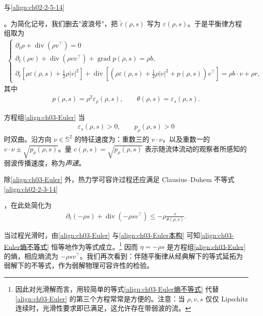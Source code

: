 ﻿\documentclass[../../main.tex]{subfiles}
\begin{document}
与\eqref{align:ch02-2-5-14}%

。为简化记号，我们删去"波浪号"，把 $\tilde{\varepsilon}(\rho,s)$ 写为 $\varepsilon(\rho,s)$。于是平衡律方程组取为
\begin{align}
\begin{cases}
\partial_{t}\rho+\operatorname{div}(\rho v^{\top})=0\\
\partial_{t}(\rho v)+\operatorname{div}(\rho vv^{\top})+\operatorname{grad}p(\rho,s)=\rho b,\\
\partial_{t}\left[\rho\varepsilon(\rho,s)+\frac{1}{2}\rho|v|^{2}\right]+\operatorname{div}\left[\left(\rho\varepsilon(\rho,s)+\frac{1}{2}\rho|v|^{2}+p(\rho,s)\right)v^{\top}\right]=\rho b\cdot v+\rho r,
\end{cases}
\label{align:ch03-Euler}
\end{align}
其中
\begin{align}
p(\rho,s)=\rho^{2}\varepsilon_{\rho}(\rho,s),\qquad \theta(\rho,s)=\varepsilon_{s}(\rho,s).
\label{align:ch03-Euler本构}
\end{align}

方程组\eqref{align:ch03-Euler} 当
\begin{align}
\varepsilon_{s}(\rho,s)>0,\qquad p_{\rho}(\rho,s)>0
\label{align:ch03-Euler双曲条件}
\end{align}
时双曲。沿方向 $\nu\in\mathbb{S}^{2}$ 的特征速度为：重数三的 $v\cdot\nu$，以及重数一的 $v\cdot\nu\pm\sqrt{p_{\rho}(\rho,s)}$。量 $c(\rho,s)=\sqrt{p_{\rho}(\rho,s)}$ 表示随流体流动的观察者所感知的弱波传播速度，称为\emph{声速}。

除\eqref{align:ch03-Euler} 外，热力学可容许过程还应满足 Clausius--Duhem 不等式\eqref{align:ch02-2-3-14}%

，在此处简化为
\begin{align}
\partial_{t}(-\rho s)+\operatorname{div}(-\rho s v^{\top})\leqslant-\rho\frac{r}{\theta(\rho,s)}.
\label{align:ch03-Euler熵不等式}
\end{align}

当过程光滑时，由\eqref{align:ch03-Euler} 与\eqref{align:ch03-Euler本构} 可知\eqref{align:ch03-Euler熵不等式} 恒等地作为等式成立。\footnote{因此对光滑解而言，用较简单的等式\eqref{align:ch03-Euler熵不等式} 代替\eqref{align:ch03-Euler} 的第三个方程常常是方便的。注意：当 $\rho,v,s$ 仅仅 Lipschitz 连续时，光滑性要求即已满足，这允许存在带弱波的流。} 因而 $\eta=-\rho s$ 是方程组\eqref{align:ch03-Euler} 的熵，相应熵流为 $-\rho s v^{\top}$。我们再次看到：伴随平衡律从经典解下的等式延拓为弱解下的不等式，作为弱解物理可容许性的检验。
\end{document}
